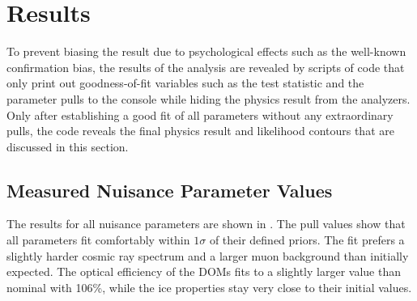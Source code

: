 \section{Results}

To prevent biasing the result due to psychological effects such as the well-known confirmation bias, the results of the analysis are revealed by scripts of code that only print out goodness-of-fit variables such as the test statistic and the parameter pulls to the console while hiding the physics result from the analyzers. Only after  establishing a good fit of all parameters without any extraordinary pulls, the code reveals the final physics result and likelihood contours that are discussed in this section.

\subsection{Measured Nuisance Parameter Values}
The results for all nuisance parameters are shown in . The pull values show that all parameters fit comfortably within $1\sigma$ of their defined priors. The fit prefers a slightly harder cosmic ray spectrum and a larger muon background than initially expected. The optical efficiency of the DOMs fits to a slightly larger value than nominal with 106\%, while the ice properties stay very close to their initial values.


